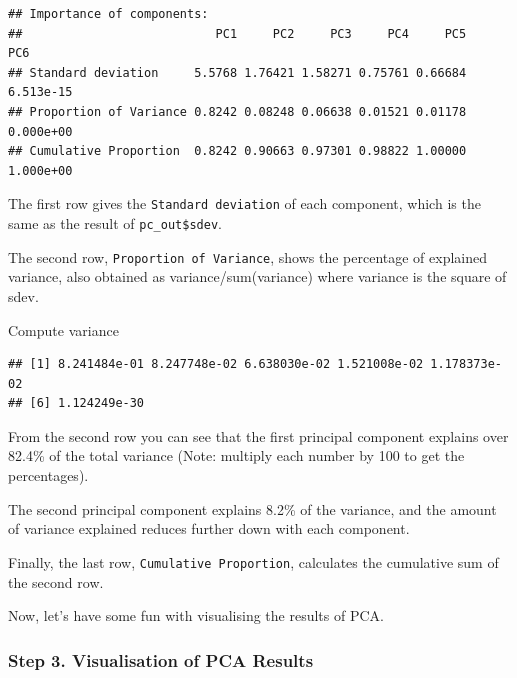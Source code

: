 \documentclass[
]{book}
\newenvironment{Shaded}{\begin{snugshade}}{\end{snugshade}}
\newcommand{\DecValTok}[1]{\textcolor[rgb]{0.00,0.00,0.81}{#1}}
\newcommand{\FunctionTok}[1]{\textcolor[rgb]{0.13,0.29,0.53}{\textbf{#1}}}
\newcommand{\NormalTok}[1]{#1}
\newcommand{\SpecialCharTok}[1]{\textcolor[rgb]{0.81,0.36,0.00}{\textbf{#1}}}
\begin{document}
\begin{verbatim}
## Importance of components:
##                           PC1     PC2     PC3     PC4     PC5       PC6
## Standard deviation     5.5768 1.76421 1.58271 0.75761 0.66684 6.513e-15
## Proportion of Variance 0.8242 0.08248 0.06638 0.01521 0.01178 0.000e+00
## Cumulative Proportion  0.8242 0.90663 0.97301 0.98822 1.00000 1.000e+00
\end{verbatim}

The first row gives the \texttt{Standard\ deviation} of each component, which is the same as the result of \texttt{pc\_out\$sdev}.

The second row, \texttt{Proportion\ of\ Variance}, shows the percentage of explained variance, also obtained as variance/sum(variance) where variance is the square of sdev.

Compute variance

\begin{Shaded}
\end{Shaded}

\begin{verbatim}
## [1] 8.241484e-01 8.247748e-02 6.638030e-02 1.521008e-02 1.178373e-02
## [6] 1.124249e-30
\end{verbatim}

From the second row you can see that the first principal component explains over 82.4\% of the total variance (Note: multiply each number by 100 to get the percentages).

The second principal component explains 8.2\% of the variance, and the amount of variance explained reduces further down with each component.

Finally, the last row, \texttt{Cumulative\ Proportion}, calculates the cumulative sum of the second row.

Now, let's have some fun with visualising the results of PCA.

\subsubsection{Step 3. Visualisation of PCA Results}\label{step-3.-visualisation-of-pca-results}
\end{document}
